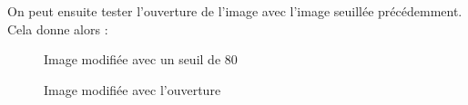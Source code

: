 \documentclass[french,a4paper,10pt]{article}
\begin{document}
	On peut ensuite tester l'ouverture de l'image avec l'image seuillée précédemment.
	Cela donne alors :
	\begin{figure}[!htb]
		\begin{minipage}{0.48\textwidth}
			\centering
			\caption{Image modifiée avec un seuil de 80}\label{Fig:test-grey-08-5}
		\end{minipage}\hfill
		\begin{minipage}{0.48\textwidth}
			\centering
			\caption{Image modifiée avec l'ouverture}\label{Fig:ouverture-test-grey-08}
		\end{minipage}
	\end{figure}
\end{document}
